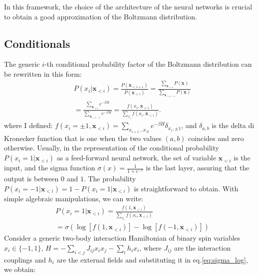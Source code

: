 \documentclass[aps,physrev,10pt,floatfix,reprint]{revtex4-2}
\begin{document}
In this framework, the choice of the architecture of the neural networks is crucial to obtain a good approximation of the Boltzmann distribution.

\subsection{Conditionals}
The generic $i$-th conditional probability factor of the Boltzmann distribution can be rewritten in this form: 
\begin{equation}
    \label{eq:chain}
    \begin{split}
    & P\left(x_{i}|\mathbf{x}_{<i}\right)  = 
    \frac{P\left(\mathbf{x}_{<i+1}\right)}{P\left(\mathbf{x}_{<i}\right)}  = 
    \frac{\sum_{\mathbf{x}_{>i}}P\left(\mathbf{x}\right)}{\sum_{\mathbf{x}_{>i-1}}P\left(\mathbf{x}\right)} \\
    &=\frac{\sum_{\mathbf{x}_{>i}}e^{-\beta H}}{\sum_{\mathbf{x}_{>i-1}}e^{-\beta H}}  = 
    \frac{f\left(x_{i},\mathbf{x}_{<i}\right)}{\sum_{x_{i}}f\left(x_{i},\mathbf{x}_{<i}\right)}.
    \end{split}
\end{equation}
where I defined: $f\left(x_{i}=\pm 1,\mathbf{x}_{<i}\right) = \sum_{x_{i+1}\dots x_{N}}e^{-\beta H}\delta_{x_i, \pm1}$, and $\delta_{a,b}$ is the delta di Kronecker function that is one when the two values $(a,b)$ coincides and zero otherwise. Usually, in the representation of the conditional probability $P\left(x_{i}=1|\mathbf{x}_{<i}\right)$ as a feed-forward neural network, the set of variable $\mathbf{x}_{<i}$ is the input, and the sigma function $\sigma(x)=\frac{1}{1+e^{-x}}$ is the last layer, assuring that the output is between $0$ and $1$. The probability $P\left(x_{i}=-1|\mathbf{x}_{<i}\right) = 1 - P\left(x_{i}=1|\mathbf{x}_{<i}\right)$ is straightforward to obtain. With simple algebraic manipulations, we can write: 
\begin{equation}
    \label{eq:sigma_log}
    \begin{split}
    & P\left(x_{i}=1|\mathbf{x}_{<i}\right) = \frac{f\left(1,\mathbf{x}_{<i}\right)}{\sum_{x_{i}}f\left(x_{i},\mathbf{x}_{<i}\right)}\\
    &= \sigma\left(\log\left[f\left(1,\mathbf{x}_{<i}\right)\right]-\log\left[f\left(-1,\mathbf{x}_{<i}\right)\right]\right)
    \end{split}
\end{equation}
Consider a generic two-body interaction Hamiltonian of binary spin variables $x_i \in \{-1,1\}$, $H = -\sum_{i<j} J_{ij} x_i x_j - \sum_{i} h_i x_i$, where $J_{ij}$ are the interaction couplings and $h_i$ are the external fields and substituting it in eq.\ref{eq:sigma_log}, we obtain:
\end{document}
